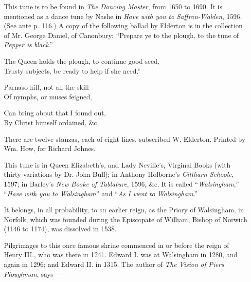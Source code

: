 
This tune is to be found in \textit{The Dancing Master}, from 1650 to 1690. It is
mentioned as a dance tune by Nashe in\textit{ Have with you to Saffron-Walden}, 1596.
(See ante p. 116.) A copy of the following ballad by Elderton is in the collection
of Mr. George Daniel, of Canonbury: “Prepare ye to the plough, to the tune
of \textit{Pepper is black}.”

\settowidth{\versewidth}{“The Queen holds the plough, to continue good seed,}
\begin{scverse}
The Queen holds the plough, to continue good seed,\\
Trusty subjects, be ready to help if she need.”
\end{scverse}




\settowidth{\versewidth}{Can bring about that I found out,}
\begin{dcverse}
Parnaso hill, not all the skill\\
Of nymphs, or muses feigned,

Can bring about that I found out,\\
By Christ himself ordained, \&c.
\end{dcverse}

There are twelve stanzas, each of eight lines, subscribed W. Elderton. Printed
by Wm. How, for Richard Johnes.


This tune is in Queen Elizabeth’s, and Lady Neville’s, Virginal Books (with
thirty variations by Dr. John Bull); in Anthony Holborne’s \textit{Cittharn Schoole},
1597; in Barley’s \textit{New Booke of Tablature}, 1596, \&c. It is called “\textit{Walsingham},”
“\textit{Have with you to Walsingham}” and “\textit{As I went to Walsingham}.”

It belongs, in all probability, to an earlier reign, as the Priory of Walsingham,
in Norfolk, which was founded during the Episcopate of William, Bishop of
Norwich (1146 to 1174), was dissolved in 1538.

Pilgrimages to this once famous shrine commenced in or before the reign of
Henry III., who was there in 1241. Edward I. was at Walsingham in 1280, and
again in 1296; and Edward II. in 1315. The author of \textit{The Vision of Piers
Ploughman}, says—

